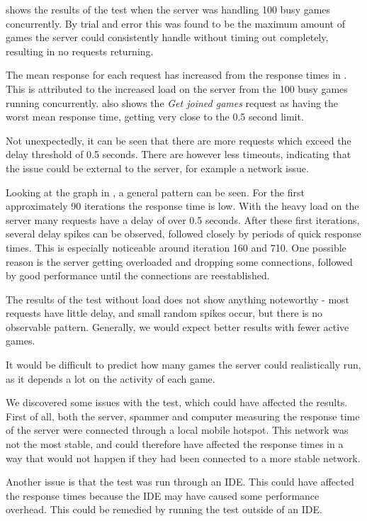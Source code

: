  shows the results of the test when the server was handling 100 busy games concurrently. By trial and error this was found to be the maximum amount of games the server could consistently handle without timing out completely, resulting in no requests returning.

The mean response for each request has increased from the response times in . This is attributed to the increased load on the server from the 100 busy games running concurrently.  also shows the \textit{Get joined games} request as having the worst mean response time, getting very close to the 0.5 second limit.

Not unexpectedly, it can be seen that there are more requests which exceed the delay threshold of 0.5 seconds. There are however less timeouts, indicating that the issue could be external to the server, for example a network issue.

Looking at the graph in , a general pattern can be seen. For the first approximately 90 iterations the response time is low. With the heavy load on the server many requests have a delay of over 0.5 seconds. After these first iterations, several delay spikes can be observed, followed closely by periods of quick response times. This is especially noticeable around iteration 160 and 710. One possible reason is the server getting overloaded and dropping some connections, followed by good performance until the connections are reestablished.

The results of the test without load does not show anything noteworthy - most requests have little delay, and small random spikes occur, but there is no observable pattern. Generally, we would expect better results with fewer active games.

It would be difficult to predict how many games the server could realistically run, as it depends a lot on the activity of each game.

We discovered some issues with the test, which could have affected the results.
First of all, both the server, spammer and computer measuring the response time of the server were connected through a local mobile hotspot. This network was not the most stable, and could therefore have affected the response times in a way that would not happen if they had been connected to a more stable network.

Another issue is that the test was run through an IDE. This could have affected the response times because the IDE may have caused some performance overhead. This could be remedied by running the test outside of an IDE.

